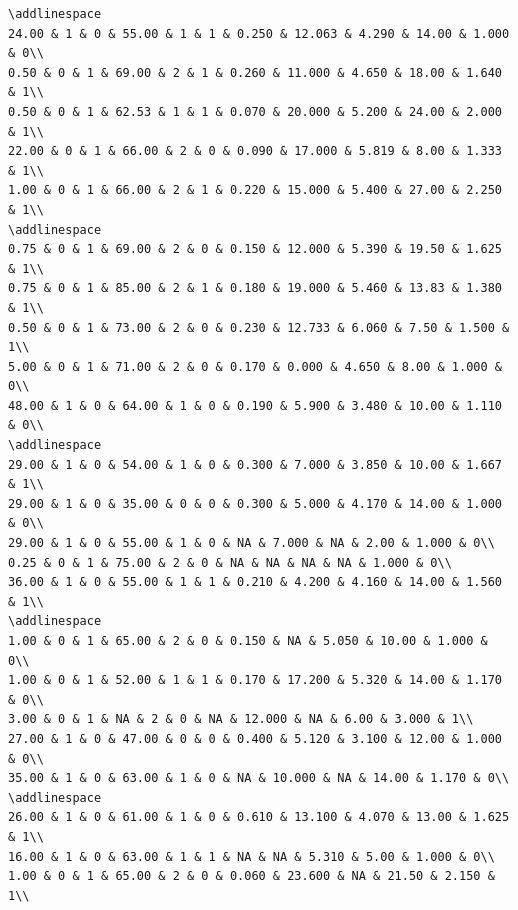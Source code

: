 \documentclass[
]{article}
\begin{document}
\begin{verbatim}
\addlinespace
24.00 & 1 & 0 & 55.00 & 1 & 1 & 0.250 & 12.063 & 4.290 & 14.00 & 1.000 & 0\\
0.50 & 0 & 1 & 69.00 & 2 & 1 & 0.260 & 11.000 & 4.650 & 18.00 & 1.640 & 1\\
0.50 & 0 & 1 & 62.53 & 1 & 1 & 0.070 & 20.000 & 5.200 & 24.00 & 2.000 & 1\\
22.00 & 0 & 1 & 66.00 & 2 & 0 & 0.090 & 17.000 & 5.819 & 8.00 & 1.333 & 1\\
1.00 & 0 & 1 & 66.00 & 2 & 1 & 0.220 & 15.000 & 5.400 & 27.00 & 2.250 & 1\\
\addlinespace
0.75 & 0 & 1 & 69.00 & 2 & 0 & 0.150 & 12.000 & 5.390 & 19.50 & 1.625 & 1\\
0.75 & 0 & 1 & 85.00 & 2 & 1 & 0.180 & 19.000 & 5.460 & 13.83 & 1.380 & 1\\
0.50 & 0 & 1 & 73.00 & 2 & 0 & 0.230 & 12.733 & 6.060 & 7.50 & 1.500 & 1\\
5.00 & 0 & 1 & 71.00 & 2 & 0 & 0.170 & 0.000 & 4.650 & 8.00 & 1.000 & 0\\
48.00 & 1 & 0 & 64.00 & 1 & 0 & 0.190 & 5.900 & 3.480 & 10.00 & 1.110 & 0\\
\addlinespace
29.00 & 1 & 0 & 54.00 & 1 & 0 & 0.300 & 7.000 & 3.850 & 10.00 & 1.667 & 1\\
29.00 & 1 & 0 & 35.00 & 0 & 0 & 0.300 & 5.000 & 4.170 & 14.00 & 1.000 & 0\\
29.00 & 1 & 0 & 55.00 & 1 & 0 & NA & 7.000 & NA & 2.00 & 1.000 & 0\\
0.25 & 0 & 1 & 75.00 & 2 & 0 & NA & NA & NA & NA & 1.000 & 0\\
36.00 & 1 & 0 & 55.00 & 1 & 1 & 0.210 & 4.200 & 4.160 & 14.00 & 1.560 & 1\\
\addlinespace
1.00 & 0 & 1 & 65.00 & 2 & 0 & 0.150 & NA & 5.050 & 10.00 & 1.000 & 0\\
1.00 & 0 & 1 & 52.00 & 1 & 1 & 0.170 & 17.200 & 5.320 & 14.00 & 1.170 & 0\\
3.00 & 0 & 1 & NA & 2 & 0 & NA & 12.000 & NA & 6.00 & 3.000 & 1\\
27.00 & 1 & 0 & 47.00 & 0 & 0 & 0.400 & 5.120 & 3.100 & 12.00 & 1.000 & 0\\
35.00 & 1 & 0 & 63.00 & 1 & 0 & NA & 10.000 & NA & 14.00 & 1.170 & 0\\
\addlinespace
26.00 & 1 & 0 & 61.00 & 1 & 0 & 0.610 & 13.100 & 4.070 & 13.00 & 1.625 & 1\\
16.00 & 1 & 0 & 63.00 & 1 & 1 & NA & NA & 5.310 & 5.00 & 1.000 & 0\\
1.00 & 0 & 1 & 65.00 & 2 & 0 & 0.060 & 23.600 & NA & 21.50 & 2.150 & 1\\

\end{verbatim}
\end{document}
